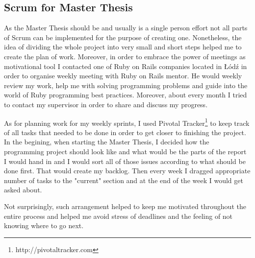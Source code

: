     \subsection{Scrum for Master Thesis}
      As the Master Thesis should be and usually is a single person effort not all parts of Scrum can be
      implemented for the purpose of creating one. Nonetheless, the idea of dividing the whole project
      into very small and short steps helped me to create the plan of work. Moreover, in order to
      embrace the power of meetings as motivational tool I contacted one of Ruby on Rails companies located
      in Łódź in order to organise weekly meeting with Ruby on Rails mentor. He would weekly review my
      work, help me with solving programming problems and guide into the world of Ruby programming best practices.
      Moreover, about every month I tried to contact my supervisor in order to share and discuss my progress.

      As for planning work for my weekly sprints, I used Pivotal Tracker\footnote{http://pivotaltracker.com}
      to keep track of all tasks that needed to be done in order to get closer to finishing the project.
      In the begining, when starting the Master Thesis, I decided how the programming project should look like and what
      would be the parts of the report I would hand in and I would sort all of those issues according to
      what should be done first. That would create my backlog. Then every week I dragged appropriate number of tasks
      to the "current" section and at the end of the week I would get asked about.

      Not surprisingly, such arrangement helped to keep me motivated throughout the entire process and
      helped me avoid stress of deadlines and the feeling of not knowing where to go next.


